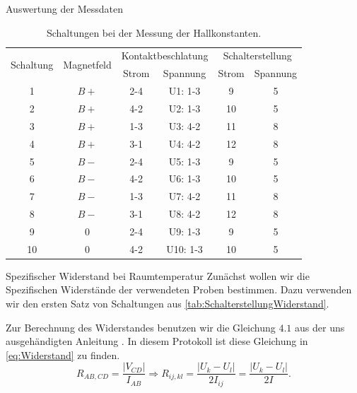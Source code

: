 \documentclass[pdftex, a4paper,11pt, twoside, ngerman]{report}
\begin{document}
\begin{chapter}{Auswertung der Messdaten}
    \begin{table}[htbp]
      \centering
      \footnotesize
      \begin{tabular}{c|c|c|c|c|c}
        \multirow{2}{*}{Schaltung} & \multirow{2}{*}{Magnetfeld} &
        \multicolumn{2}{c|}{Kontaktbeschlatung} &
        \multicolumn{2}{c}{Schalterstellung} \\
        & & Strom & Spannung & Strom & Spannung \\ \hline \hline
        1  & $B+$ & 2-4 & U1:  1-3 & 9  & 5 \\
        2  & $B+$ & 4-2 & U2:  1-3 & 10 & 5 \\
        3  & $B+$ & 1-3 & U3:  4-2 & 11 & 8 \\
        4  & $B+$ & 3-1 & U4:  4-2 & 12 & 8 \\
        5  & $B-$ & 2-4 & U5:  1-3 & 9  & 5 \\
        6  & $B-$ & 4-2 & U6:  1-3 & 10 & 5 \\
        7  & $B-$ & 1-3 & U7:  4-2 & 11 & 8 \\
        8  & $B-$ & 3-1 & U8:  4-2 & 12 & 8 \\
        9  & $0$  & 2-4 & U9:  1-3 & 9  & 5 \\
        10 & $0$  & 4-2 & U10: 1-3 & 10 & 5 \\
      \end{tabular}
      \caption{Schaltungen bei der Messung der Hallkonstanten.}
      \label{tab:SchalterstellungHall}
    \end{table}
    
    \begin{section}{Spezifischer Widerstand bei Raumtemperatur}
      \label{chp:AuswertungSpezifischerWiderstandRaumtemperatur}
      Zunächst wollen wir die Spezifischen Widerstände der verwendeten Proben
      bestimmen.
      Dazu verwenden wir den ersten Satz von Schaltungen aus
      \cref{tab:SchalterstellungWiderstand}.
      
      Zur Berechnung des Widerstandes benutzen wir die Gleichung $4.1$ aus
      der uns ausgehändigten Anleitung \cite{bib:Anleitung}.
      In diesem Protokoll ist diese Gleichung in \cref{eq:Widerstand} zu finden.
      \begin{equation}
        \label{eq:Widerstand}
        R_{AB,CD}=\frac{|V_{CD}|}{I_{AB}} \Longrightarrow R_{ij,kl}=
        \frac{|U_{k}-U_{l}|}{2I_{ij}} = \frac{|U_{k}-U_{l}|}{2I}.
      \end{equation}
      

\end{section}
\end{chapter}
\end{document}
